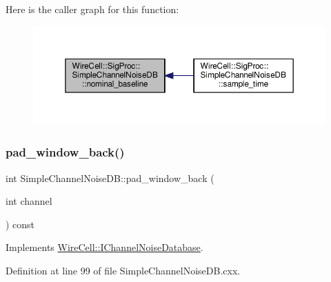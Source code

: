 Here is the caller graph for this function\+:
\nopagebreak
\begin{figure}[H]
\begin{center}
\leavevmode
\includegraphics[width=350pt]{class_wire_cell_1_1_sig_proc_1_1_simple_channel_noise_d_b_ae5b0390412d61c8fab8514ddd8358fa1_icgraph}
\end{center}
\end{figure}
\mbox{\label{class_wire_cell_1_1_sig_proc_1_1_simple_channel_noise_d_b_a4643919d65336ba0090213d772bb6bf9}} 
\subsubsection{\texorpdfstring{pad\+\_\+window\+\_\+back()}{pad\_window\_back()}}
{\footnotesize\ttfamily int Simple\+Channel\+Noise\+D\+B\+::pad\+\_\+window\+\_\+back (\begin{DoxyParamCaption}\item[{int}]{channel }\end{DoxyParamCaption}) const\hspace{0.3cm}{\ttfamily [virtual]}}



Implements \hyperlink{class_wire_cell_1_1_i_channel_noise_database_a4d772c3ba5f7071a2d869264f37dfecc}{Wire\+Cell\+::\+I\+Channel\+Noise\+Database}.



Definition at line 99 of file Simple\+Channel\+Noise\+D\+B.\+cxx.

